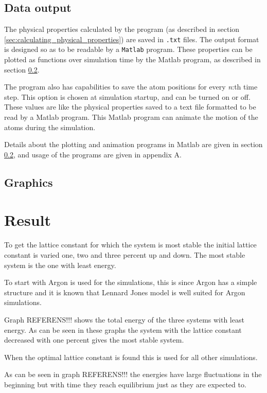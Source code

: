 \documentclass[12pt,a4paper]{article}
\begin{document}
\subsection{Data output}
\label{sec:data_output}
The physical properties calculated by the program (as described in section \ref{sec:calculating_physical_properties}) are saved in \texttt{.txt} files. The output format is designed so as to be readable by a \texttt{Matlab} program. These properties can be plotted as functions over simulation time by the Matlab program, as described in section \ref{sec:graphics}. 

The program also has capabilities to save the atom positions for every \emph{n}:th time step. This option is chosen at simulation startup, and can be turned on or off. These values are like the physical properties saved to a text file formatted to be read by a Matlab program. This Matlab program can animate the motion of the atoms during the simulation. 

Details about the plotting and animation programs in Matlab are given in section \ref{sec:graphics}, and usage of the programs are given in appendix A.

\subsection{Graphics}
\label{sec:graphics}


\newpage
\section{Result}
\label{sec:Result}

To get the lattice constant for which the system is most stable the initial lattice constant is varied one, two and three percent up and down. The most stable system is the one with least energy.

To start with Argon is used for the simulations, this is since Argon  has a simple structure and it is known that Lennard Jones model is well suited for Argon simulations.

Graph REFERENS!!! shows the total energy of the three systems with least energy. As can be seen in these graphs the system with the lattice constant decreased with one percent gives the most stable system.

When the optimal lattice constant is found this is used for all other simulations.

As can be seen in graph REFERENS!!! the energies have large fluctuations in the beginning but with time they reach equilibrium just as they are expected to.
\end{document}
